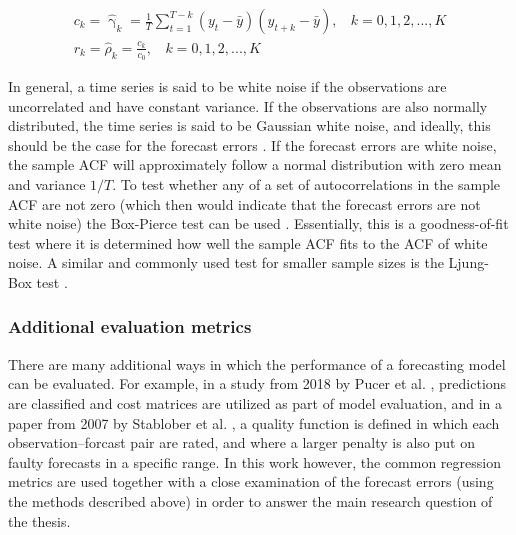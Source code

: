 \begin{gather}
     c_k=\hat{\upgamma}_k = \frac{1}{T} \sum_{t=1}^{T-k} (y_t - \bar{y})(y_{t+k} - \bar{y}), \:\:\:\: k = 0,1,2,...,K \label{eq:sample_covariance} \\[1ex]
     r_k = \hat{\rho}_k = \frac{c_k}{c_0}, \:\:\:\: k = 0,1,2,...,K \label{eq:sample_correlation}
\end{gather}

In general, a time series is said to be white noise if the observations are uncorrelated and have constant variance. If the observations are also normally distributed, the time series is said to be Gaussian white noise, and ideally, this should be the case for the forecast errors \cite{Montgomery2015}. If the forecast errors are white noise, the sample ACF will approximately follow a normal distribution with zero mean and variance $1/T$. To test whether any of a set of autocorrelations in the sample ACF are not zero (which then would indicate that the forecast errors are not white noise) the Box-Pierce test can be used \cite{Montgomery2015}. Essentially, this is a goodness-of-fit test where it is determined how well the sample ACF fits to the ACF of white noise. A similar and commonly used test for smaller sample sizes is the Ljung-Box test \cite{Montgomery2015}.

\subsubsection{Additional evaluation metrics}
There are many additional ways in which the performance of a forecasting model can be evaluated. For example, in a study from 2018 by Pucer et al. \cite{FaganeliPucer2018}, predictions are classified and cost matrices are utilized as part of model evaluation, and in a paper from 2007 by Stablober et al. \cite{Stadlober2008}, a quality function is defined in which each observation--forcast pair are rated, and where a larger penalty is also put on faulty forecasts in a specific range. In this work however, the common regression metrics are used together with a close examination of the forecast errors (using the methods described above) in order to answer the main research question of the thesis.  




